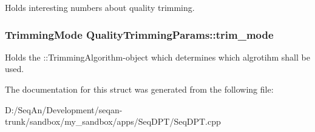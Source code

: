 Holds interesting numbers about quality trimming. \hypertarget{struct_quality_trimming_params_a048e76b525de1500f55f39e9e572ab80}{
\subsubsection[{trim\-\_\-mode}]{\setlength{\rightskip}{0pt plus 5cm}Trimming\-Mode Quality\-Trimming\-Params\-::trim\-\_\-mode}}\label{struct_quality_trimming_params_a048e76b525de1500f55f39e9e572ab80}
Holds the \-::\-Trimming\-Algorithm-\/object which determines which algrotihm shall be used. 

The documentation for this struct was generated from the following file\-:\begin{DoxyCompactItemize}
\item 
D\-:/\-Seq\-An/\-Development/seqan-\/trunk/sandbox/my\-\_\-sandbox/apps/\-Seq\-D\-P\-T/Seq\-D\-P\-T.\-cpp\end{DoxyCompactItemize}
